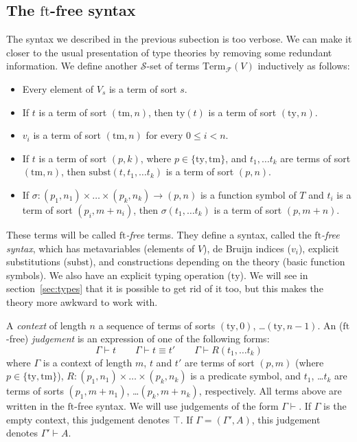 \documentclass[reqno]{amsart}
\theoremstyle{definition}
\theoremstyle{remark}
\newcommand{\fs}[1]{\mathrm{#1}}
\newcommand{\Term}{\fs{Term}}
\newcommand{\subst}{\fs{subst}}
\newcommand{\ft}{\fs{ft}}
\newcommand{\ty}{\fs{ty}}
\newcommand{\tm}{\fs{tm}}
\numberwithin{figure}{section}
\begin{document}

\subsection{The $\ft$-free syntax}
\label{sec:contexts}

The syntax we described in the previous subection is too verbose.
We can make it closer to the usual presentation of type theories by removing some redundant information.
We define another $\mathcal{S}$-set of terms $\Term_\mathcal{F}(V)$ inductively as follows:
\begin{itemize}
\item Every element of $V_s$ is a term of sort $s$.
\item If $t$ is a term of sort $(\tm,n)$, then $\ty(t)$ is a term of sort $(\ty,n)$.
\item $v_i$ is a term of sort $(\tm,n)$ for every $0 \leq i < n$.
\item If $t$ is a term of sort $(p,k)$, where $p \in \{ \ty, \tm \}$, and $t_1, \ldots t_k$ are terms of sort $(\tm,n)$, then $\subst(t, t_1, \ldots t_k)$ is a term of sort $(p,n)$.
\item If $\sigma : (p_1,n_1) \times \ldots \times (p_k,n_k) \to (p,n)$ is a function symbol of $T$ and $t_i$ is a term of sort $(p_i,m+n_i)$, then $\sigma(t_1, \ldots t_k)$ is a term of sort $(p,m+n)$.
\end{itemize}
These terms will be called \emph{$\ft$-free} terms.
They define a syntax, called the \emph{$\ft$-free syntax}, which has metavariables (elements of $V$), de Bruijn indices ($v_i$), explicit substitutions ($\subst$), and constructions depending on the theory (basic function symbols).
We also have an explicit typing operation ($\ty$).
We will see in section~\ref{sec:types} that it is possible to get rid of it too, but this makes the theory more awkward to work with.

A \emph{context} of length $n$ a sequence of terms of sorts $(\ty,0)$, \ldots $(\ty,n-1)$.
An ($\ft$-free) \emph{judgement} is an expression of one of the following forms:
\[ \Gamma \vdash t \qquad \Gamma \vdash t \equiv t' \qquad \Gamma \vdash R(t_1, \ldots t_k) \]
where $\Gamma$ is a context of length $m$, $t$ and $t'$ are terms of sort $(p,m)$ (where $p \in \{ \ty, \tm \}$), $R : (p_1,n_1) \times \ldots \times (p_k,n_k)$ is a predicate symbol, and $t_1$, \ldots $t_k$ are terms of sorts $(p_1,m+n_1)$, \ldots $(p_k,m+n_k)$, respectively.
All terms above are written in the $\ft$-free syntax.
We will use judgements of the form $\Gamma \vdash$.
If $\Gamma$ is the empty context, this judgement denotes $\top$.
If $\Gamma = (\Gamma', A)$, this judgement denotes $\Gamma' \vdash A$.
\end{document}
